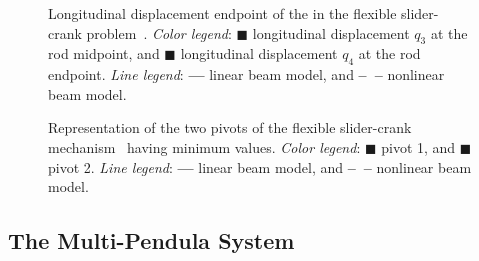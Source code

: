 \begin{figure}[htb]
  \centering
  \small{}
  \caption{Longitudinal displacement endpoint of the in the flexible slider-crank problem~\cite{lioen1998test, mazzia2008test}. \emph{Color legend}: \textcolor{mycolor2}{$\blacksquare$} longitudinal displacement $q_3$ at the rod midpoint, and \textcolor{mycolor1}{$\blacksquare$} longitudinal displacement $q_4$ at the rod endpoint. \emph{Line legend}: \textbf{---} linear beam model, and \textbf{--~--} nonlinear beam model.}
  \label{chap5:fig:flexible_slider_crank}
\end{figure}

\begin{figure}[htb]
  \centering
  \small{}
  \caption{Representation of the two pivots of the flexible slider-crank mechanism~\cite{lioen1998test, mazzia2008test} having minimum values. \emph{Color legend}: \textcolor{mycolor1}{$\blacksquare$} pivot 1, and \textcolor{mycolor2}{$\blacksquare$} pivot 2. \emph{Line legend}: \textbf{---} linear beam model, and \textbf{--~--} nonlinear beam model.}
  \label{chap5:fig:flexible_slider_crank_pivots}
\end{figure}

\subsection{The Multi-Pendula System}

